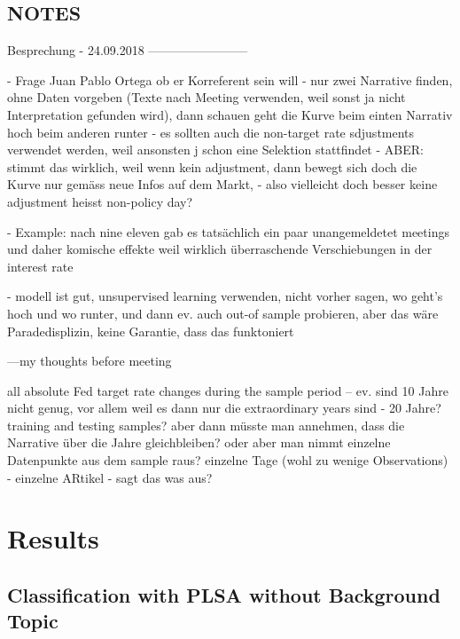 \documentclass[11pt,a4paper,english,oneside]{book}
\numberwithin{equation}{chapter}
\begin{document}


\section{NOTES}
Besprechung - 24.09.2018
------------------------

- Frage Juan Pablo Ortega ob er Korreferent sein will
- nur zwei Narrative finden, ohne Daten vorgeben (Texte nach Meeting verwenden, weil sonst ja nicht Interpretation gefunden wird), dann schauen geht die Kurve beim einten Narrativ hoch beim anderen runter
- es sollten auch die non-target rate sdjustments verwendet werden, weil ansonsten j schon eine Selektion stattfindet - ABER: stimmt das wirklich, weil wenn kein adjustment, dann bewegt sich doch die Kurve nur gemäss neue Infos auf dem Markt, - also vielleicht doch besser keine adjustment heisst non-policy day?

- Example: nach nine eleven gab es tatsächlich ein paar unangemeldetet meetings und daher komische effekte weil wirklich überraschende Verschiebungen in der interest rate

- modell ist gut, unsupervised learning verwenden, nicht vorher sagen, wo geht's hoch und wo runter, und dann ev. auch out-of sample probieren, aber das wäre Paradedisplizin, keine Garantie, dass das funktoniert

---my thoughts before meeting

all absolute Fed target rate changes during the sample period -- ev. sind 10 Jahre nicht genug, vor allem weil es dann nur die extraordinary years sind - 20 Jahre? training and testing samples? aber dann müsste man annehmen, dass die Narrative über die Jahre gleichbleiben? oder aber man nimmt einzelne Datenpunkte aus dem sample raus? einzelne Tage (wohl zu wenige Observations) - einzelne ARtikel - sagt das was aus?


\chapter{Results}

\section{Classification with PLSA without Background Topic}
\end{document}
